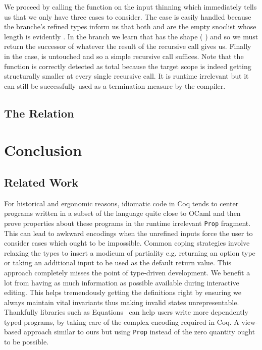 \documentclass{article}
\newcommand{\coq}{Coq}
\begin{document}

We proceed by calling the  function on the input thinning
which immediately tells us that we only have three cases to consider.
%
The  case is easily handled because the branche's refined
types inform us that both  and  are the
empty snoclist \IdrisData{[<]} whose length is evidently .
%
In the  branch we learn that  has the shape
(\IdrisBound{\_} \IdrisData{:<} ) and so we must return the
successor of whatever the result of the recursive call gives us.
%
Finally in the  case,  is untouched and so a
simple recursive call suffices.
%
Note that the function is correctly detected as total because the target scope
 is indeed getting structurally smaller at every single recursive
call.
%
It is runtime irrelevant but it can still be successfully used as a termination
measure by the compiler.

\subsection{The  Relation}

\section{Conclusion}

\subsection{Related Work}

For historical and ergonomic reasons, idiomatic code in \coq{} tends to center programs
written in a subset of the language quite close to OCaml and then prove properties
about these programs in the runtime irrelevant \texttt{Prop} fragment.
%
This can lead to awkward encodings when the unrefined inputs force the user to consider
cases which ought to be impossible. Common coping strategies involve relaxing the types
to insert a modicum of partiality e.g. returning an option type or taking an additional
input to be used as the default return value.
%
This approach completely misses the point of type-driven development. We benefit a lot
from having as much information as possible available during interactive editing. This
helps tremendously getting the definitions right by ensuring we always maintain vital
invariants thus making invalid states unrepresentable.
%
Thankfully libraries such as Equations~\cite{DBLP:conf/itp/Sozeau10,DBLP:journals/pacmpl/SozeauM19}
can help users write more dependently typed programs, by taking care of the complex
encoding required in \coq{}. A view-based approach similar to ours but using \texttt{Prop}
instead of the zero quantity ought to be possible.
\end{document}
